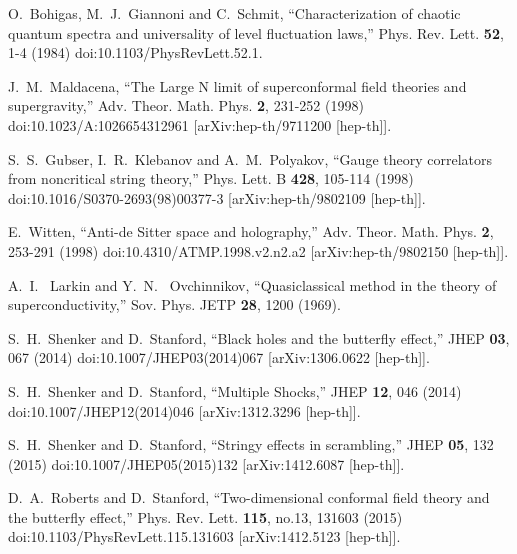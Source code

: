 \documentclass[preprintnumbers,aps,prd,longbibliography,nofootinbib,nobibnotes,amsmath,amssymb]{revtex4}
\begin{document}
\begin{thebibliography}{99}

O.~Bohigas, M.~J.~Giannoni and C.~Schmit,
``Characterization of chaotic quantum spectra and universality of level fluctuation laws,''
Phys. Rev. Lett. \textbf{52}, 1-4 (1984)
doi:10.1103/PhysRevLett.52.1.


J.~M.~Maldacena,
``The Large N limit of superconformal field theories and supergravity,''
Adv. Theor. Math. Phys. \textbf{2}, 231-252 (1998)
doi:10.1023/A:1026654312961
[arXiv:hep-th/9711200 [hep-th]].

S.~S.~Gubser, I.~R.~Klebanov and A.~M.~Polyakov,
``Gauge theory correlators from noncritical string theory,''
Phys. Lett. B \textbf{428}, 105-114 (1998)
doi:10.1016/S0370-2693(98)00377-3
[arXiv:hep-th/9802109 [hep-th]].

E.~Witten,
``Anti-de Sitter space and holography,''
Adv. Theor. Math. Phys. \textbf{2}, 253-291 (1998)
doi:10.4310/ATMP.1998.v2.n2.a2
[arXiv:hep-th/9802150 [hep-th]].

A.~I.~ Larkin and Y.~N.~ Ovchinnikov,
``Quasiclassical method in the theory of superconductivity,''
Sov. Phys. JETP \textbf{28}, 1200 (1969).

S.~H.~Shenker and D.~Stanford,
``Black holes and the butterfly effect,''
JHEP \textbf{03}, 067 (2014)
doi:10.1007/JHEP03(2014)067
[arXiv:1306.0622 [hep-th]].

S.~H.~Shenker and D.~Stanford,
``Multiple Shocks,''
JHEP \textbf{12}, 046 (2014)
doi:10.1007/JHEP12(2014)046
[arXiv:1312.3296 [hep-th]].

S.~H.~Shenker and D.~Stanford,
``Stringy effects in scrambling,''
JHEP \textbf{05}, 132 (2015)
doi:10.1007/JHEP05(2015)132
[arXiv:1412.6087 [hep-th]].

D.~A.~Roberts and D.~Stanford,
``Two-dimensional conformal field theory and the butterfly effect,''
Phys. Rev. Lett. \textbf{115}, no.13, 131603 (2015)
doi:10.1103/PhysRevLett.115.131603
[arXiv:1412.5123 [hep-th]].


\end{thebibliography}
\end{document}
